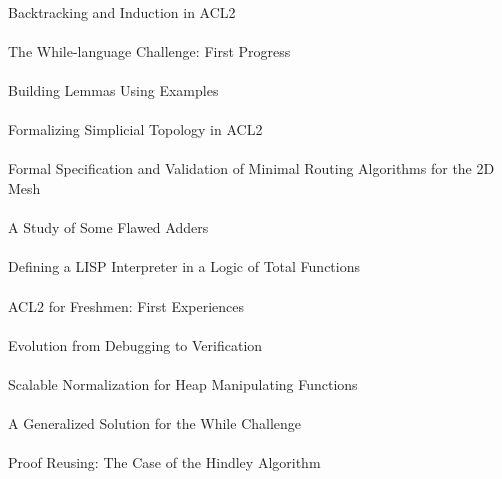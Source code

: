 \documentclass{article}
\begin{document}
\cite{07-erickson-backtracking} \\
Backtracking and Induction in {ACL2} \\

\cite{07-cowles-challenge} \\
The While-language Challenge: First Progress \\

\cite{07-infante-lopez-examples} \\
Building Lemmas Using Examples \\

\cite{07-andres-topology} \\
Formalizing Simplicial Topology in {ACL2} \\

\cite{07-schmaltz-routing} \\
Formal Specification and Validation of Minimal Routing Algorithms for the {2D} Mesh \\

\cite{07-hunt-adders} \\
A Study of Some Flawed Adders \\

\cite{07-gordon-interpreter} \\
Defining a {LISP} Interpreter in a Logic of Total Functions \\

\cite{07-eastlund-freshmen} \\
{ACL2} for Freshmen: First Experiences \\

\cite{07-rimlinger-evolution} \\
Evolution from Debugging to Verification \\

\cite{07-greve-heap} \\
Scalable Normalization for Heap Manipulating Functions \\

\cite{07-ray-challenge} \\
A Generalized Solution for the While Challenge \\

\cite{07-sotes-hindley} \\
Proof Reusing: The Case of the {Hindley} Algorithm \\
\end{document}

